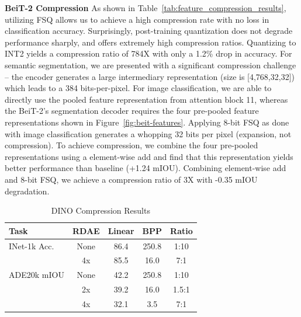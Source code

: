 \documentclass[10pt,twocolumn,letterpaper]{article}
\begin{document}
\textbf{BeiT-2 Compression}
As shown in Table~\ref{tab:feature_compression_results}, utilizing FSQ allows us to achieve a high compression rate with no loss in classification accuracy. Surprisingly, post-training quantization does not degrade performance sharply, and offers extremely high compression ratios. Quantizing to INT2 yields a compression ratio of 784X with only a 1.2\% drop in accuracy. For semantic segmentation, we are presented with a significant compression challenge -- the encoder generates a large intermediary representation (size is [4,768,32,32]) which leads to a 384 bits-per-pixel. For image classification, we are able to directly use the pooled feature representation from attention block 11, whereas the BeiT-2's segmentation decoder requires the four pre-pooled feature representations shown in Figure~\ref{fig:beit-features}. Applying 8-bit FSQ as done with image classification generates a whopping 32 bits per pixel (expansion, not compression). To achieve compression, we combine the four pre-pooled representations using a element-wise add and find that this representation yields better performance than baseline (+1.24 mIOU). Combining element-wise add and 8-bit FSQ, we achieve a compression ratio of 3X with -0.35 mIOU degradation.

\begin{table}
\centering
\caption{DINO Compression Results}
\label{tab:dino_compression_results}
\begin{tabular}{l|cccc}
\toprule
Task & RDAE & Linear & BPP & Ratio \\
\midrule
\cmidrule(lr){1-5}
INet-1k Acc. & None & 86.4 & 250.8 & 1:10 \\
& 4x & 85.5 & 16.0 & 7:1 \\
\midrule
\cmidrule(lr){1-5}
ADE20k mIOU & None & 42.2 & 250.8 & 1:10 \\
& 2x & 39.2 & 16.0 & 1.5:1 \\
& 4x & 32.1 & 3.5 & 7:1 \\
\bottomrule
\end{tabular}
\end{table}
\end{document}
